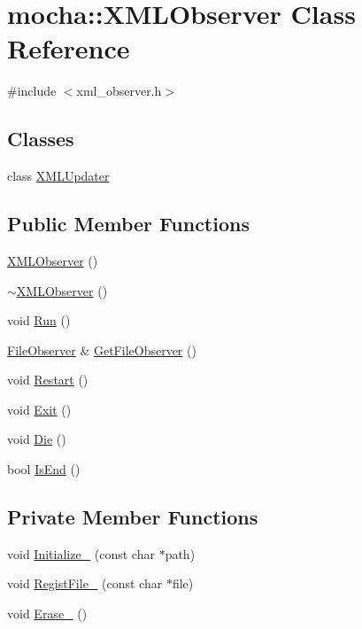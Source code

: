 \hypertarget{classmocha_1_1_x_m_l_observer}{
\section{mocha::XMLObserver Class Reference}
\label{classmocha_1_1_x_m_l_observer}
}


{\ttfamily \#include $<$xml\_\-observer.h$>$}

\subsection*{Classes}
\begin{DoxyCompactItemize}
\item 
class \hyperlink{classmocha_1_1_x_m_l_observer_1_1_x_m_l_updater}{XMLUpdater}
\end{DoxyCompactItemize}
\subsection*{Public Member Functions}
\begin{DoxyCompactItemize}
\item 
\hyperlink{classmocha_1_1_x_m_l_observer_a9a29f4b4f84d4472989aa7bc84ad23b7}{XMLObserver} ()
\item 
\hyperlink{classmocha_1_1_x_m_l_observer_af717c5920a03ee38d31fe2b8bc480e23}{$\sim$XMLObserver} ()
\item 
void \hyperlink{classmocha_1_1_x_m_l_observer_acb844a2db8acd78eed6c4bff3b001b0a}{Run} ()
\item 
\hyperlink{classmocha_1_1_file_observer}{FileObserver} \& \hyperlink{classmocha_1_1_x_m_l_observer_acb9933a1c6b63c3b1ca851a853aa4e84}{GetFileObserver} ()
\item 
void \hyperlink{classmocha_1_1_x_m_l_observer_a3b20e0e912c839183895d82340b1286f}{Restart} ()
\item 
void \hyperlink{classmocha_1_1_x_m_l_observer_aa1de42a7307b4904241b285162f3a224}{Exit} ()
\item 
void \hyperlink{classmocha_1_1_x_m_l_observer_a778e419dd1f065323449a346c19eb154}{Die} ()
\item 
bool \hyperlink{classmocha_1_1_x_m_l_observer_a7cc20855dccaa41f5b6af96abcfc368e}{IsEnd} ()
\end{DoxyCompactItemize}
\subsection*{Private Member Functions}
\begin{DoxyCompactItemize}
\item 
void \hyperlink{classmocha_1_1_x_m_l_observer_a1c4884f86d6ececdbf339139e26f9fd1}{Initialize\_\-} (const char $\ast$path)
\item 
void \hyperlink{classmocha_1_1_x_m_l_observer_a140c10714abee73dfe8434cebf6dca2c}{RegistFile\_\-} (const char $\ast$file)
\item 
void \hyperlink{classmocha_1_1_x_m_l_observer_a0badf63e19321153c23a5adaaa3f38ae}{Erase\_\-} ()
\end{DoxyCompactItemize}

